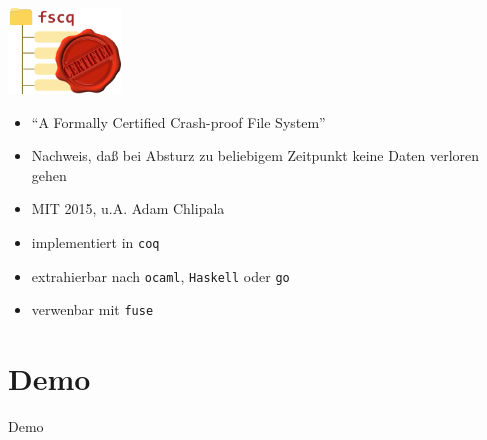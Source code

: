 \documentclass[aspectratio=169]{beamer}
\begin{document}
\begin{frame}
  \begin{center}
    \includegraphics[width=3.0cm]{fscq_logo.png}
  \end{center}
  \begin{itemize}
  \item ``A Formally Certified Crash-proof File System''
  \item Nachweis, daß bei Absturz zu beliebigem Zeitpunkt keine Daten verloren gehen
  \item MIT 2015, u.A. Adam Chlipala
  \item implementiert in \texttt{coq}
  \item extrahierbar nach \texttt{ocaml}, \texttt{Haskell} oder \texttt{go}
  \item verwenbar mit \texttt{fuse} 
  \end{itemize}
\end{frame}
\section{Demo}
\begin{frame}
  \begin{center}
    \huge{Demo}
  \end{center}
\end{frame}
\end{document}
